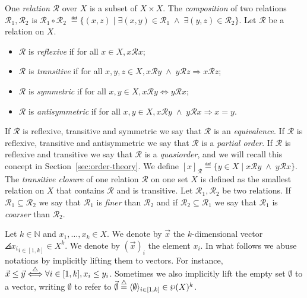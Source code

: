 One \emph{relation} $\mathscr{R}$ over $X$ is a subset of $X \times X$.
The \emph{composition} of two relations $\mathscr{R}_1,\mathscr{R}_2$ is
$\mathscr{R}_1 \circ \mathscr{R}_2 \; \eqdef \{(x,z) \;|\; \exists (x,y) \in \mathord{\mathscr{R}_1}\; \wedge \; \exists (y,z) \in \mathord{\mathscr{R}_2  }\}$.
Let $\mathscr{R}$ be a relation on $X$.
\begin{itemize}
\item $\mathscr{R}$ is \emph{reflexive} if for all $x \in X, x \mathscr{R} x$;
\item $\mathscr{R}$ is \emph{transitive} if for all $x,y,z \in X, x \mathscr{R} y \; \wedge \; y \mathscr{R} z \Longrightarrow x \mathscr{R} z$;
\item $\mathscr{R}$ is \emph{symmetric} if for all $x,y \in X, x \mathscr{R} y \Longleftrightarrow y \mathscr{R} x$;
\item $\mathscr{R}$ is \emph{antisymmetric} if for all $x,y \in X, x \mathscr{R} y \; \wedge \; y \mathscr{R} x \Longrightarrow x = y$.
\end{itemize}

If $\mathscr{R}$ is reflexive, transitive and symmetric we say that $\mathscr{R}$ is an \emph{equivalence}.
If $\mathscr{R}$ is reflexive, transitive and antisymmetric we say that
$\mathscr{R}$ is a \emph{partial order}.
If $\mathscr{R}$ is reflexive and transitive we say that $\mathscr{R}$ is a
\emph{quasiorder}, and we will recall this concept in Section~\ref{sec:order-theory}.
We define $[x]_{\mathscr{R}} \eqdef \{y \in X \;|\; x \mathscr{R} y \; \wedge \; y \mathscr{R} x\}$.
The \emph{transitive closure} of one relation $\mathscr{R}$ on one set $X$
is defined as the
smallest relation on $X$ that contains $\mathscr{R}$ and is transitive.
Let $\mathscr{R}_1,\mathscr{R}_2$ be two relations.
If $\mathord{\mathscr{R}_1} \subseteq \mathord{\mathscr{R}_2}$ we say that $\mathscr{R}_1$ is \emph{finer} than $\mathscr{R}_2$
and if $\mathord{\mathscr{R}_2} \subseteq \mathord{\mathscr{R}_1}$  we say that $\mathscr{R}_1$ is \emph{coarser} than $\mathscr{R}_2$.

Let $k \in \mathbb{N}$ and $x_1, \dots, x_k \in X$.
We denote by $\vec{x}$ the $k$-dimensional vector $\angles{x_i}_{i \in [1,k]} \in X^k$.
We denote by $(\vec{x})_i$ the element $x_i$.
In what follows we abuse notations by implicitly lifting them to vectors.
For instance, $\vec{x} \leq \vec{y} \overset{\triangle}{\Longleftrightarrow} \forall i \in [1,k], x_i \leq y_i$.
Sometimes we also implicitly lift the empty set $\emptyset$ to a vector,
writing $\emptyset$ to refer to
$\vec{\emptyset} \eqdef \angles{\emptyset}_{i \in [1,k]} \in \powerset(X)^k$.

